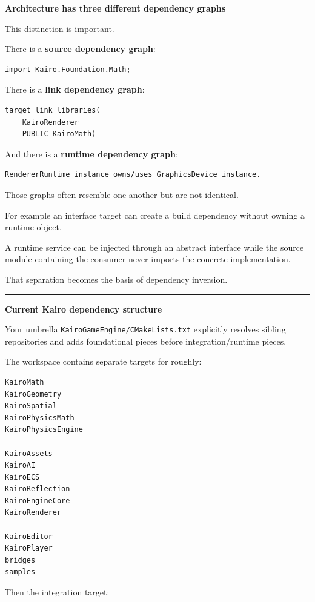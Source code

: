 \textbf{Architecture has three different dependency graphs}

This distinction is important.

There is a \textbf{source dependency graph}:

\begin{verbatim}
import Kairo.Foundation.Math;
\end{verbatim}

There is a \textbf{link dependency graph}:

\begin{verbatim}
target_link_libraries(
    KairoRenderer
    PUBLIC KairoMath)
\end{verbatim}

And there is a \textbf{runtime dependency graph}:

\begin{verbatim}
RendererRuntime instance owns/uses GraphicsDevice instance.
\end{verbatim}

Those graphs often resemble one another but are not identical.

For example an interface target can create a build dependency without owning a runtime object.

A runtime service can be injected through an abstract interface while the source module containing the consumer never imports the concrete implementation.

That separation becomes the basis of dependency inversion.

\begin{center}\rule{0.5\linewidth}{0.5pt}\end{center}

\textbf{Current Kairo dependency structure}

Your umbrella \texttt{KairoGameEngine/CMakeLists.txt} explicitly resolves sibling repositories and adds foundational pieces before integration/runtime pieces.

The workspace contains separate targets for roughly:

\begin{verbatim}
KairoMath
KairoGeometry
KairoSpatial
KairoPhysicsMath
KairoPhysicsEngine

KairoAssets
KairoAI
KairoECS
KairoReflection
KairoEngineCore
KairoRenderer

KairoEditor
KairoPlayer
bridges
samples
\end{verbatim}

Then the integration target:

